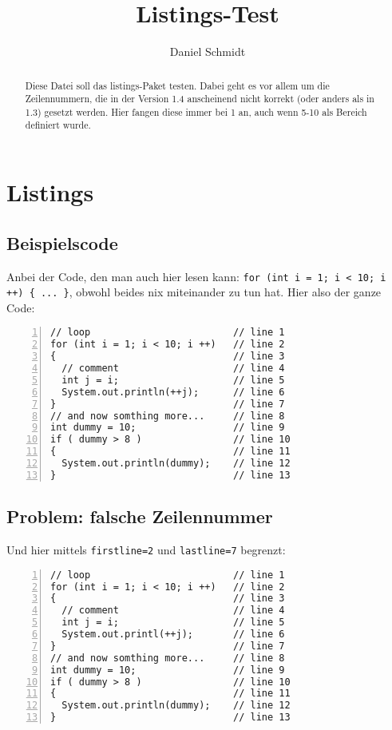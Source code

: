\documentclass[a4paper,10pt]{article}
\title{Listings-Test}
\author{Daniel Schmidt}
\begin{document}
\maketitle

\begin{abstract}
Diese Datei soll das listings-Paket testen. Dabei geht es vor allem um die Zeilennummern, die in der Version 1.4 anscheinend nicht korrekt (oder anders als in 1.3) gesetzt werden. Hier fangen diese immer bei 1 an, auch wenn 5-10 als Bereich definiert wurde.
\end{abstract}

\section{Listings}

\subsection{Beispielscode}
Anbei der Code, den man auch hier lesen kann: \lstinline$for (int i = 1; i < 10; i ++) { ... }$, obwohl beides nix miteinander zu tun hat. Hier also der ganze Code:

\begin{lstlisting}[numbers=left, frame=single]
// loop                         // line 1
for (int i = 1; i < 10; i ++)   // line 2
{                               // line 3
  // comment                    // line 4
  int j = i;                    // line 5
  System.out.println(++j);      // line 6
}                               // line 7
// and now somthing more...     // line 8
int dummy = 10;                 // line 9
if ( dummy > 8 )                // line 10
{                               // line 11
  System.out.println(dummy);    // line 12
}                               // line 13
\end{lstlisting}

\subsection{Problem: falsche Zeilennummer}
Und hier mittels \texttt{\verb|firstline=2|} und \texttt{\verb|lastline=7|} begrenzt:

\begin{lstlisting}[numbers=left, frame=single, firstline=2, lastline=7]
// loop                         // line 1
for (int i = 1; i < 10; i ++)   // line 2
{                               // line 3
  // comment                    // line 4
  int j = i;                    // line 5
  System.out.printl(++j);       // line 6
}                               // line 7
// and now somthing more...     // line 8
int dummy = 10;                 // line 9
if ( dummy > 8 )                // line 10
{                               // line 11
  System.out.println(dummy);    // line 12
}                               // line 13
\end{lstlisting}
\end{document}
